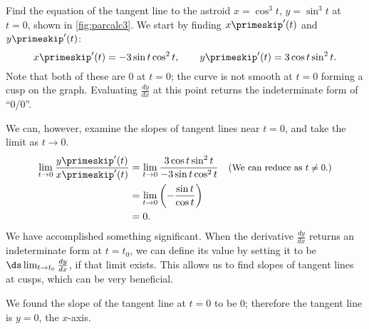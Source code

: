 \begin{example}\label{ex_parcalc3}
Find the equation of the tangent line to the astroid $x=\cos^3 t$, $y=\sin^3t$ at $t=0$, shown in \autoref{fig:parcalc3}.
\solution
We start by finding $x\primeskip'(t)$ and $y\primeskip'(t)$:
%
%
\[x\primeskip'(t) = -3\sin t\cos^2t, \qquad y\primeskip'(t) = 3\cos t\sin^2t.\]
Note that both of these are 0 at $t=0$; the curve is not smooth at $t=0$ forming a cusp on the graph. Evaluating $\frac{dy}{dx}$ at this point returns the indeterminate form of ``0/0''. 

We can, however, examine the slopes of tangent lines near $t=0$, and take the limit as $t\to 0$. 
\begin{align*}
	\lim_{t\to0} \frac{y\primeskip'(t)}{x\primeskip'(t)}
	&=\lim_{t\to0} \frac{3\cos t\sin^2t}{-3\sin t\cos^2t}
	\quad \text{\small (We can reduce as $t\neq 0$.)}\\
	&= \lim_{t\to0}\left(-\frac{\sin t}{\cos t}\right)\\
	&= 0.
\end{align*}
We have accomplished something significant. When the derivative $\frac{dy}{dx}$ returns an indeterminate form at $t=t_0$, we can define its value by setting it to be $\ds \lim_{t\to t_0}\frac{dy}{dx}$, if that limit exists. This allows us to find slopes of tangent lines at cusps, which can be very beneficial. 

We found the slope of the tangent line at $t=0$ to be 0; therefore the tangent line is $y=0$, the $x$-axis.
\end{example}

